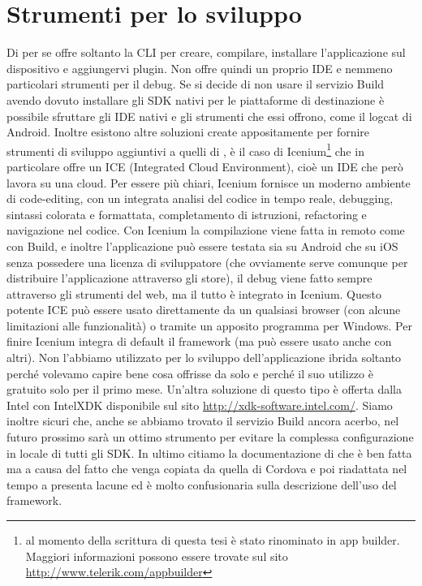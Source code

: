    \section{Strumenti per lo sviluppo}
    Di per se \pg{} offre soltanto la CLI per creare, compilare,
    installare l'applicazione sul dispositivo e aggiungervi plugin. Non
    offre quindi un proprio IDE e nemmeno particolari strumenti per il
    debug. Se si decide di non usare il servizio \pg{} Build avendo dovuto
    installare gli SDK nativi per le piattaforme di destinazione è
    possibile sfruttare gli IDE nativi e gli strumenti che essi offrono,
    come il logcat di Android. Inoltre esistono altre soluzioni create
    appositamente per fornire strumenti di sviluppo aggiuntivi a quelli di
    \pg{}, è il caso di Icenium\footnote{al momento della scrittura di
    questa tesi è stato rinominato in app builder.
    Maggiori informazioni possono essere trovate sul sito
    \url{http://www.telerik.com/appbuilder}} che in particolare offre un
    ICE (Integrated Cloud Environment), cioè un IDE che però lavora su una
    cloud. Per essere più chiari, Icenium fornisce un moderno ambiente di
    code-editing, con un integrata analisi del codice in tempo reale,
    debugging, sintassi colorata e formattata, completamento di istruzioni,
    refactoring e navigazione nel codice. Con Icenium la compilazione
    viene fatta in remoto come con \pg{} Build, e inoltre l'applicazione
    può essere testata sia su Android che su iOS senza possedere una
    licenza di sviluppatore (che ovviamente serve comunque per distribuire
    l'applicazione attraverso gli store), il debug viene fatto sempre
    attraverso gli strumenti del web, ma il tutto è integrato in Icenium.
    Questo potente ICE può essere usato direttamente da un qualsiasi browser
    (con alcune limitazioni alle funzionalità) o tramite un apposito
    programma per Windows. Per finire Icenium integra di default il
    framework \kendomob{} (ma può essere usato anche con altri). Non
    l'abbiamo utilizzato per lo sviluppo dell'applicazione ibrida soltanto
    perché volevamo capire bene cosa offrisse da solo \pg{} e perché il
    suo utilizzo è gratuito solo per il primo mese. Un'altra soluzione di
    questo tipo è offerta dalla Intel con IntelXDK disponibile sul sito
    \url{http://xdk-software.intel.com/}. Siamo inoltre sicuri che,
    anche se abbiamo trovato il servizio \pg{} Build ancora acerbo, nel
    futuro prossimo sarà un ottimo strumento per evitare la complessa
    configurazione in locale di tutti gli SDK. In ultimo citiamo la
    documentazione di \pg{} che è ben fatta ma a causa del fatto che venga
    copiata da quella di Cordova e poi riadattata nel tempo a \pg{}
    presenta lacune ed è molto confusionaria sulla descrizione dell'uso
    del framework.

